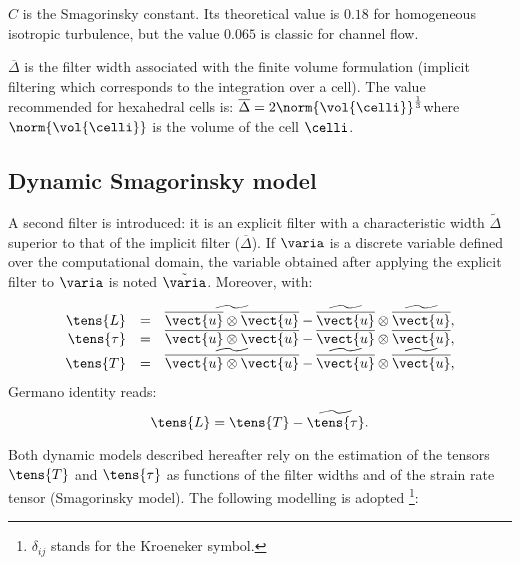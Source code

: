 $C$ is the Smagorinsky constant. Its theoretical value is $0.18$ for
homogeneous isotropic turbulence, but the value $0.065$ is classic for
channel flow. 

$\overline{\Delta }$ is the filter width associated with the finite volume
formulation (implicit filtering which corresponds to the integration over a
cell). The value recommended for hexahedral cells is: $\overline{\Delta }
=2 \norm{\vol{\celli}}^{\frac{1}{3}}$where $\norm{\vol{\celli}}$ is the volume of the cell $\celli$.

\subsection{Dynamic Smagorinsky model}
A second filter is introduced: it is an explicit filter with a
characteristic width $\widetilde{\Delta }$ superior to that of the implicit
filter ($\overline{\Delta }$). If $\varia$ is a discrete variable defined over
the computational domain, the variable obtained after applying the explicit
filter to $\varia$ is noted $\tilde{\varia}$. Moreover, with:

\begin{equation}
\begin{array}{ r c l}
\tens{L} & = &\widetilde{\overline{\vect{u}} \otimes \overline{\vect{u}}}
-\widetilde{\overline{\vect{u}}} \otimes \widetilde{\overline{ \vect{u}}}, \\
\tens{\tau} & = & \overline{ \vect{u} \otimes \vect{u}}-\overline{\vect{u}} \otimes \overline{ \vect{u}}, \\
\tens{T} &= &\widetilde{\overline{ \vect{u} \otimes \vect{u}}}-\widetilde{\overline{\vect{u}}} \otimes
\widetilde{\overline{ \vect{u}}},
\end{array}
\end{equation}
Germano identity reads:
\begin{equation}
\tens{L} = \tens{T}-\widetilde{\tens{\tau}}.
\end{equation}

Both dynamic models described hereafter rely on the estimation of the tensors
$\tens{T}$ and $\tens{\tau}$ as functions of the filter widths and of the
strain rate tensor (Smagorinsky model). The following modelling is adopted%
\footnote{$\delta_{ij}$ stands for the Kroeneker symbol.}:

